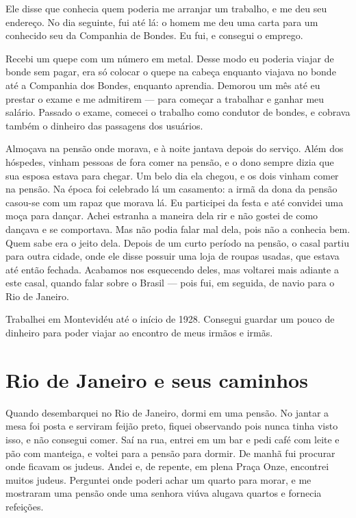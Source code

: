 Ele disse que conhecia quem poderia me arranjar um trabalho, e me deu seu
endereço. No dia seguinte, fui até lá: o homem me deu uma carta para um
conhecido seu da Companhia de Bondes. Eu fui, e consegui o emprego.

Recebi um quepe com um número em metal. Desse modo eu poderia viajar de
bonde sem pagar, era só colocar o quepe na cabeça enquanto viajava no
bonde até a Companhia dos Bondes, enquanto aprendia. Demorou um mês 
até eu prestar o exame e me admitirem --- para começar a trabalhar e ganhar 
meu salário. Passado o exame, comecei o trabalho 
como condutor de bondes, e cobrava também o dinheiro das passagens dos usuários.

Almoçava na pensão onde morava, e à noite jantava depois do serviço. Além dos hóspedes, 
vinham pessoas de fora comer na pensão, e o dono sempre
dizia que sua esposa estava para chegar. Um belo dia ela chegou, e os
dois vinham comer na pensão. Na época foi celebrado lá um casamento: a irmã
da dona da pensão casou-se com um rapaz que morava lá. Eu participei da
festa e até convidei uma moça para dançar. Achei estranha a maneira dela 
rir e não gostei de como dançava e se comportava. Mas não podia
falar mal dela, pois não a conhecia bem. Quem sabe era o jeito dela.
Depois de um curto período na pensão, o casal partiu para outra cidade,
onde ele disse possuir uma loja de roupas usadas, que estava até então 
fechada. Acabamos nos esquecendo deles, mas voltarei mais adiante a este
casal, quando falar sobre o Brasil --- pois fui, em seguida, de navio para o
Rio de Janeiro.

Trabalhei em Montevidéu até o início de 1928. Consegui guardar um pouco
de dinheiro para poder viajar ao encontro de meus irmãos e irmãs.

\chapter{Rio de Janeiro e seus caminhos}

Quando desembarquei no Rio de Janeiro, dormi em uma pensão. No
jantar a mesa foi posta e serviram feijão preto, fiquei observando
pois nunca tinha visto isso, e não consegui comer. Saí na rua, entrei
em um bar e pedi café com leite e pão com manteiga, e voltei para a
pensão para dormir. De manhã fui procurar onde ficavam os judeus. Andei
e, de repente, em plena Praça Onze, encontrei muitos judeus.
Perguntei onde poderi achar um quarto para morar, e me
mostraram uma pensão onde uma senhora viúva alugava quartos e fornecia
refeições.

